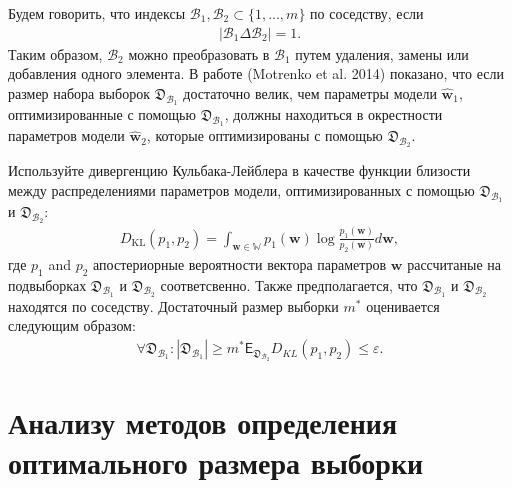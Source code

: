 Будем говорить, что индексы $\mathcal{B}_1,\mathcal{B}_2 \subset \{1,...,m\}$ по соседству, если
\[
\label{eq:bs:8}
\begin{aligned}
	\left|\mathcal{B}_1 \Delta \mathcal{B}_2\right| = 1.
\end{aligned}
\]
Таким образом, $\mathcal{B}_2 $ можно преобразовать в $\mathcal{B}_1$ путем удаления, замены или добавления одного элемента. В работе (Motrenko et al. 2014) показано, что если размер набора выборок $\mathfrak {D}_{\mathcal {B}_1}$ достаточно велик, чем параметры модели $\hat{\textbf {w}}_1$, оптимизированные с помощью $\mathfrak{D}_{\mathcal{B}_1}$, должны находиться в окрестности параметров модели $\hat{\textbf{w}}_2 $, которые оптимизированы с помощью $\mathfrak{D}_{\mathcal {B}_2}$.
	 
Используйте дивергенцию Кульбака-Лейблера в качестве функции близости между распределениями параметров модели, оптимизированных с помощью $\mathfrak{D}_{\mathcal{B}_1}$ и $\mathfrak{D}_{\mathcal{B}_2}$:
\[
\label{eq:bs:9}
\begin{aligned}
	D_\text{KL}\left(p_1, p_2\right) = \int_{\textbf{w}\in\mathbb{W}}p_1(\textbf{w})\log\frac{p_1(\textbf{w})}{p_2(\textbf{w})}d\textbf{w},
\end{aligned}
\]
где $p_1$ and $p_2$ апостериорные вероятности вектора параметров $\textbf{w}$ рассчитаные на подвыборках $\mathfrak{D}_{\mathcal{B}_1}$ и $\mathfrak{D}_{\mathcal{B}_2}$ соответсвенно. Также предполагается, что $\mathfrak{D}_{\mathcal{B}_1}$ и $\mathfrak{D}_{\mathcal{B}_2}$ находятся по соседству.
Достаточный размер выборки $m^*$ оценивается следующим образом:
\[
\label{eq:bs:10}
\begin{aligned}
	\forall \mathfrak{D}_{\mathcal{B}_1}: \left|\mathfrak{D}_{\mathcal{B}_1}\right| \geq m^*    \mathsf{E}_{\mathfrak{D}_{\mathcal{B}_2}}D_{KL}\left(p_1, p_2\right) \leq \varepsilon.
\end{aligned}
\]

	  
\section{Анализу методов определения оптимального размера выборки}
\begin{table}[!htp]
\centering
\caption{Описание выборок для анализа качества определения оптимального размера выборки}
\label{table20}
\end{table} 

